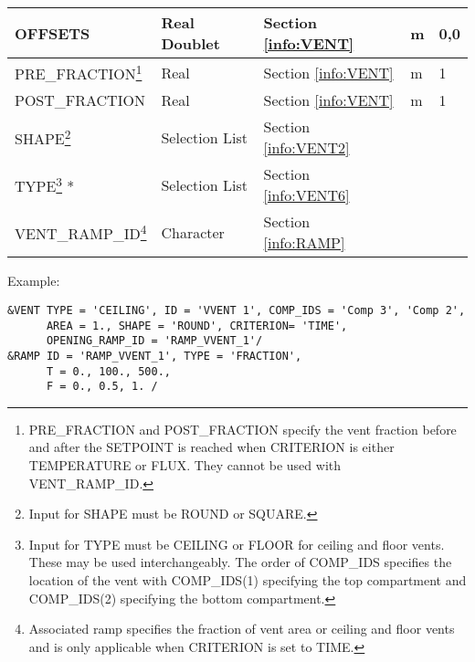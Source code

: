 \begin{minipage}{6.5in}
\begin{longtable}{@{\extracolsep{\fill}}|l|l|l|l|l|}
{\ct OFFSETS}       					 & Real Doublet 		  & Section \ref{info:VENT}      & m                           &      0,0        \\ \hline
{\ct PRE\_FRACTION}\footnote{{\ct PRE\_FRACTION} and {\ct POST\_FRACTION} specify the vent fraction before and after the {\ct SETPOINT} is reached when {\ct CRITERION} is either {\ct TEMPERATURE} or {\ct FLUX}. They cannot be used with {\ct VENT\_RAMP\_ID}.}       					 & Real 		  & Section \ref{info:VENT}      & m                           &      1        \\ \hline
{\ct POST\_FRACTION}       					 & Real 		  & Section \ref{info:VENT}      & m                           &      1        \\ \hline
{\ct SHAPE}\footnote{Input for {\ct SHAPE} must be {\ct ROUND} or {\ct SQUARE}.}
                                                                 & Selection List         & Section \ref{info:VENT2}     &                             &                 \\ \hline
{\ct TYPE}\footnote{Input for {\ct TYPE} must be {\ct CEILING} or {\ct FLOOR} for ceiling and floor vents. These may be used interchangeably. The order of {\ct COMP\_IDS} specifies the location of the vent with {\ct COMP\_IDS(1)} specifying the top compartment and {\ct COMP\_IDS(2)} specifying the bottom compartment.} *
                                                                 & Selection List         & Section \ref{info:VENT6}     &                             &                 \\ \hline
{\ct VENT\_RAMP\_ID}\footnote{Associated ramp specifies the fraction of vent area or ceiling and floor vents and is only applicable when {\ct CRITERION} is set to {\ct TIME}.}  					 & Character  		  & Section \ref{info:RAMP}      &                             &                 \\ \hline
\end{longtable}
\end{minipage}


\noindent Example:
\begin{lstlisting}
&VENT TYPE = 'CEILING', ID = 'VVENT 1', COMP_IDS = 'Comp 3', 'Comp 2',
      AREA = 1., SHAPE = 'ROUND', CRITERION= 'TIME',
      OPENING_RAMP_ID = 'RAMP_VVENT_1'/
&RAMP ID = 'RAMP_VVENT_1', TYPE = 'FRACTION',
      T = 0., 100., 500.,
      F = 0., 0.5, 1. /

\end{lstlisting}

